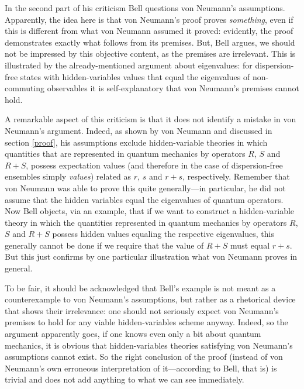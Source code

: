 \documentclass[11pt]{article}
\begin{document}
In the second part of his criticism Bell questions von Neumann's assumptions. Apparently, the idea here is that von Neumann's proof proves \emph{something}, even if this is different from what von Neumann assumed it proved: evidently, the proof demonstrates exactly what  follows from its premises. But, Bell argues, we should not be impressed by this objective content, as the premises are irrelevant. This is illustrated by the already-mentioned argument about eigenvalues: for dispersion-free states with hidden-variables values that equal the eigenvalues of non-commuting observables it is self-explanatory that von Neumann's premises cannot hold.

A remarkable aspect of this criticism is that it does not identify a mistake in von Neumann's argument. Indeed, as shown by von Neumann and discussed in section \ref{proof}, his assumptions exclude hidden-variable theories in which quantities that are represented in quantum mechanics by operators $R$, $S$ and $R+S$, possess expectation values (and therefore in the case of dispersion-free ensembles simply \emph{values}) related as $r$, $s$ and $r+s$, respectively. Remember that von Neumann was able to prove this quite generally---in particular, he did not assume that the hidden variables equal the eigenvalues of quantum operators. Now Bell objects, via an example, that if we want to construct a hidden-variable theory in which the quantities represented in quantum mechanics by operators $R$, $S$ and $R + S$ possess hidden values equaling the respective eigenvalues, this generally cannot be done if we require that the value of $R + S$ must equal $r + s$. But this just confirms by one particular illustration  what von Neumann proves in general.

To be fair, it should be acknowledged that Bell's example is not meant as a counterexample to von Neumann's assumptions, but rather as a rhetorical device that shows their irrelevance: one should not seriously expect von Neumann's premises to hold for any viable hidden-variables scheme anyway. Indeed, so the argument apparently goes, if one knows even only a bit about quantum mechanics, it is obvious that hidden-variables theories satisfying von Neumann's assumptions cannot exist. So the right conclusion of the proof (instead of von Neumann's own erroneous interpretation of it---according to Bell, that is) is trivial and does not add anything to what we can see immediately.
\end{document}
